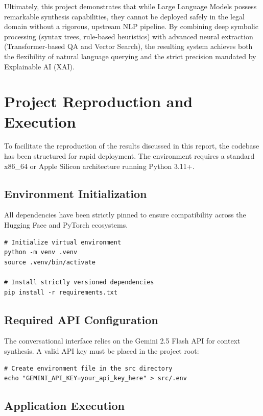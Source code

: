 \documentclass[twoside,final]{hcmut-report}
\begin{document}
\medskip

Ultimately, this project demonstrates that while Large Language Models possess remarkable synthesis capabilities, they cannot be deployed safely in the legal domain without a rigorous, upstream NLP pipeline. By combining deep symbolic processing (syntax trees, rule-based heuristics) with advanced neural extraction (Transformer-based QA and Vector Search), the resulting system achieves both the flexibility of natural language querying and the strict precision mandated by Explainable AI (XAI).

\appendix
\section{Project Reproduction and Execution}

To facilitate the reproduction of the results discussed in this report, the codebase has been structured for rapid deployment. The environment requires a standard x86\_64 or Apple Silicon architecture running Python 3.11+.

\subsection{Environment Initialization}
All dependencies have been strictly pinned to ensure compatibility across the Hugging Face and PyTorch ecosystems.

\begin{verbatim}
# Initialize virtual environment
python -m venv .venv
source .venv/bin/activate

# Install strictly versioned dependencies
pip install -r requirements.txt
\end{verbatim}

\subsection{Required API Configuration}

The conversational interface relies on the Gemini 2.5 Flash API for context synthesis. A valid API key must be placed in the project root:

\begin{verbatim}
# Create environment file in the src directory
echo "GEMINI_API_KEY=your_api_key_here" > src/.env
\end{verbatim}

\subsection{Application Execution}
\end{document}
